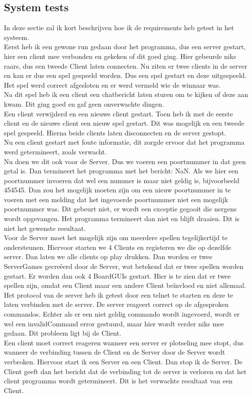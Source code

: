 \documentclass[12pt]{article}
\begin{document}
\subsection{System tests}
In deze sectie zal ik kort beschrijven hoe ik de requirements heb getest in het systeem.\\
Eerst heb ik een gewone run gedaan door het programma, dus een server gestart, hier een client mee verbonden en gekeken of dit goed ging. Hier gebeurde niks raars, dus een tweede Client laten connecten. Nu ziten er twee clients in de server en kan er dus een spel gespeeld worden. Dus een spel gestart en deze uitgespeeld. Het spel werd correct afgesloten en er werd vermeld wie de winnaar was. \\
Na dit spel heb ik een client een chatbericht laten sturen om te kijken of deze aan kwam. Dit ging goed en gaf geen onverwachte dingen.\\
Een client verwijderd en een nieuwe client gestart. Toen heb ik met de eerste client en de nieuwe client een nieuw spel gestart. Dit was mogelijk en een tweede spel gespeeld. Hierna beide clients laten disconnecten en de server gestopt.\\
Nu een client gestart met foute informatie, dit zorgde ervoor dat het programma werd getermineert, zoals verwacht.\\
Nu doen we dit ook voor de Server. Dus we voeren een poortnummer in dat geen getal is. Dan termineert het programma met het bericht: NaN. Als we hier een poortnummer invoeren dat wel een nummer is maar niet geldig is, bijvoorbeeld 454545. Dan zou het mogelijk moeten zijn om een nieuw poortnummer in te voeren met een melding dat het ingevoerde poortnummer niet een mogelijk poortnummer was. Dit gebeurt niet, er wordt een exceptie gegooit die nergens wordt opgevangen. Het programma termineert dan niet en blijft draaien. Dit is niet het gewenste resultaat.\\
Voor de Server moet het mogelijk zijn om meerdere spellen tegelijkertijd te ondersteunen. Hiervoor starten we 4 Clients en registeren we die op dezelfde server. Dan laten we alle clients op play drukken. Dan worden er twee ServerGames gecre\"eerd door de Server, wat betekend dat er twee spellen worden gestart. Er worden dan ook 4 BoardGUIs gestart. Hier is te zien dat er twee spellen zijn, omdat een Client maar een andere Client be\"invloed en niet allemaal.\\
Het protocol van de server heb ik getest door een telnet te starten en deze te laten verbinden met de server. De server reageert correct op de afgesproken commandos. Echter als er een niet geldig commando wordt ingevoerd, wordt er wel een invalidCommand error gestuurd, maar hier wordt verder niks mee gedaan. Dit probleem ligt bij de Client.\\
Een client moet correct reageren wanneer een server er plotseling mee stopt, dus wanneer de verbinding tussen de Client en de Server door de Server wordt verbroken. Hiervoor start ik een Server en een Client. Dan stop ik de Server. De Client geeft dan het bericht dat de verbinding tot de server is verloren en dat het client programma wordt getermineert. Dit is het verwachte resultaat van een Client.
\end{document}
